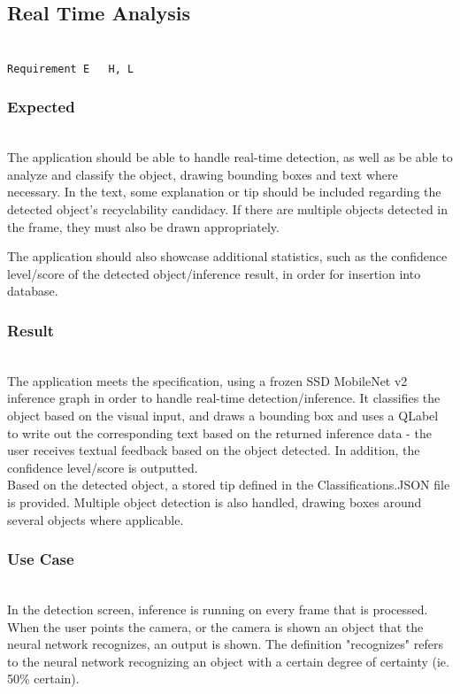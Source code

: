 \documentclass[conference]{IEEEtran}
\begin{document}
\subsection{Real Time Analysis}~\\
\texttt{Requirement E ~ H, L}~\\
\subsubsection{Expected}~\\
The application should be able to handle real-time detection, as well as be able to analyze and classify the object, drawing bounding boxes and text where necessary. In the text, some explanation or tip should be included regarding the detected object's recyclability candidacy. If there are multiple objects detected in the frame, they must also be drawn appropriately.

The application should also showcase additional statistics, such as the confidence level/score of the detected object/inference result, in order for insertion into database.~\\

\subsubsection{Result}~\\
The application meets the specification, using a frozen SSD MobileNet v2 inference graph in order to handle real-time detection/inference. It classifies the object based on the visual input, and draws a bounding box and uses a QLabel to write out the corresponding text based on the returned inference data - the user receives textual feedback based on the object detected. In addition, the confidence level/score is outputted.\\

Based on the detected object, a stored tip defined in the Classifications.JSON file is provided. Multiple object detection is also handled, drawing boxes around several objects where applicable. \\

\subsubsection{Use Case}~\\
In the detection screen, inference is running on every frame that is processed. When the user points the camera, or the camera is shown an object that the neural network recognizes, an output is shown. The definition "recognizes" refers to the neural network recognizing an object with a certain degree of certainty (ie. 50\% certain). \\
\end{document}
